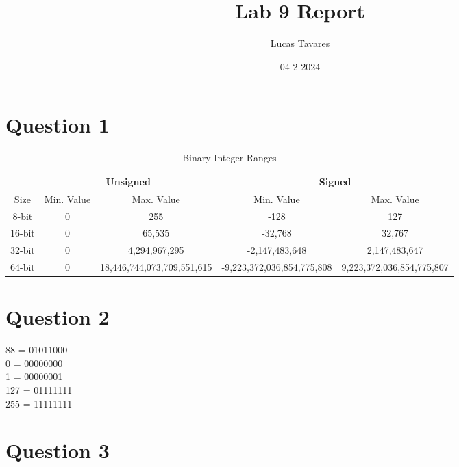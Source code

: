 \documentclass{article}
\title{Lab 9 Report}
\date{04-2-2024}
\author{Lucas Tavares}
\begin{document}
\maketitle


\newpage

\section{Question 1}

\begin{table}[H]
  \begin{adjustwidth}{-4cm}{-4cm}
  \centering
  \caption{Binary Integer Ranges}
  \label{table:Question1}
  \begin{tabular}{|c|c|c|c|c|} %
    \hline
    \multirow{2}{*}{} & \multicolumn{2}{c}{Unsigned} & \multicolumn{2}{|c|}{Signed} \\
    \hline
    Size & Min. Value & Max. Value & Min. Value & Max. Value \\
    \hline
    8-bit & 0 & 255 & -128 & 127 \\
    \hline
    16-bit & 0 & 65,535 & -32,768 & 32,767 \\
    \hline
    32-bit & 0 & 4,294,967,295 & -2,147,483,648 & 2,147,483,647 \\
    \hline
    64-bit & 0 & 18,446,744,073,709,551,615 & -9,223,372,036,854,775,808 & 9,223,372,036,854,775,807 \\
    \hline
  \end{tabular}
  \end{adjustwidth}
\end{table}


\section{Question 2}

88 = 01011000 \\
0 = 00000000 \\
1 = 00000001 \\
127 = 01111111 \\
255 = 11111111 \\


\section{Question 3}
\end{document}
